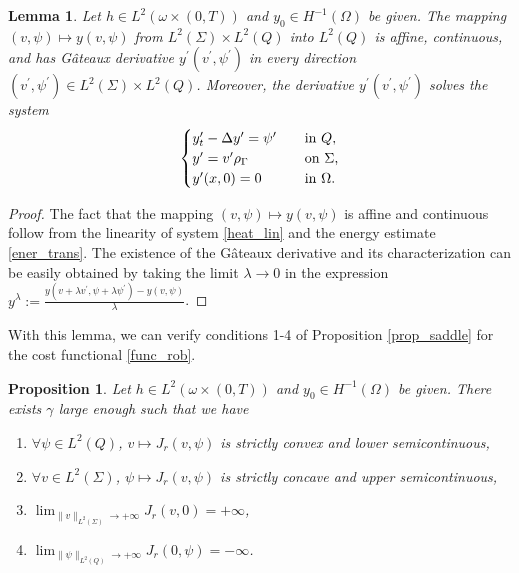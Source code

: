 \documentclass{aims}
\newtheorem{lemma}[theorem]{Lemma}
\newtheorem{proposition}{Proposition}
\theoremstyle{definition}
\def\csbd{\rho_{\Gamma}}
\begin{document}
\begin{lemma}\label{lemma_prop_sol1}
Let $h\in L^2(\omega\times(0,T))$ and $y_0\in H^{-1}(\Omega)$ be given. The mapping $(v,\psi)\mapsto y(v,\psi)$ from $L^2(\Sigma)\times L^2(Q)$ into $L^2(Q)$ is affine, continuous, and has G\^{a}teaux derivative $y^\prime(v^\prime,\psi^\prime)$ in every direction $(v^\prime,\psi^\prime)\in L^2(\Sigma)\times L^2(Q)$. Moreover, the derivative $y^\prime(v^\prime,\psi^\prime)$ solves the system
%
\begin{equation}\label{deriv_sys1}
\begin{cases}
y^\prime_t-\Delta y^\prime=\psi^\prime \quad &\textnormal{in $Q$}, \\
y^\prime=v^\prime\csbd \quad &\textnormal{on $\Sigma$,} \\
y^\prime(x,0)=0 \quad &\textnormal{in $\Omega$}.
\end{cases}
\end{equation}
%
\end{lemma}

\begin{proof}
The fact that the mapping $(v,\psi)\mapsto y(v,\psi)$ is affine and continuous follow from the linearity of system \eqref{heat_lin} and the energy estimate \eqref{ener_trans}. The existence of the G\^{a}teaux derivative and its characterization can be easily obtained by taking the limit $\lambda\to 0$ in the expression $y^\lambda:=\frac{y(v+\lambda v^\prime,\psi+\lambda\psi^\prime)-y(v,\psi)}{\lambda}$.
%
\end{proof}

With this lemma, we can verify conditions 1-4 of Proposition \ref{prop_saddle} for the cost functional \eqref{func_rob}.
%
\begin{proposition}\label{verif_cond}
Let $h\in L^2(\omega\times(0,T))$ and $y_0\in H^{-1}(\Omega)$ be given. There exists $\gamma$ large enough such that we have 
%
\begin{enumerate}
\item $\forall \psi\in L^2(Q)$, $v\mapsto J_r(v,\psi)$ is strictly convex and lower semicontinuous,
\item $\forall v\in L^2(\Sigma)$, $\psi\mapsto J_r(v,\psi)$ is strictly concave and upper semicontinuous,
\item $\lim_{\|v\|_{L^2(\Sigma)}\to+\infty}J_r(v,0)=+\infty$, 
\item $\lim_{\|\psi\|_{L^2(Q)}\to+\infty}J_r(0,\psi)=-\infty$.
\end{enumerate}
%
\end{proposition}
%
\end{document}
